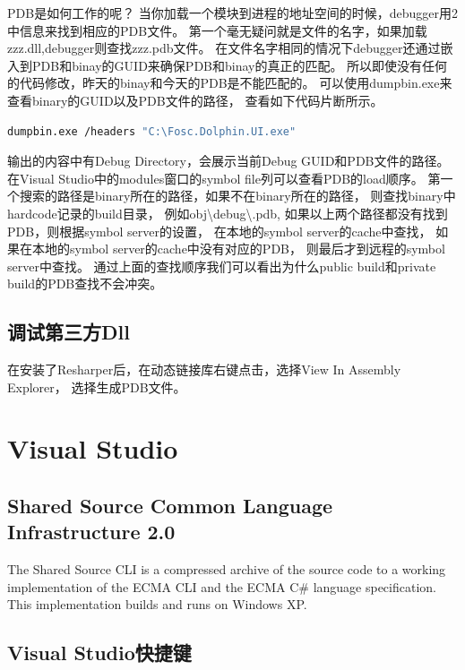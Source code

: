 \documentclass{book}
\begin{document}
PDB是如何工作的呢？
当你加载一个模块到进程的地址空间的时候，debugger用2中信息来找到相应的PDB文件。
第一个毫无疑问就是文件的名字，如果加载zzz.dll,debugger则查找zzz.pdb文件。
在文件名字相同的情况下debugger还通过嵌入到PDB和binay的GUID来确保PDB和binay的真正的匹配。
所以即使没有任何的代码修改，昨天的binay和今天的PDB是不能匹配的。
可以使用dumpbin.exe来查看binary的GUID以及PDB文件的路径，
查看如下代码片断所示。 

\begin{lstlisting}[language=Bash]
dumpbin.exe /headers "C:\Fosc.Dolphin.UI.exe"
\end{lstlisting}

输出的内容中有Debug Directory，会展示当前Debug GUID和PDB文件的路径。 
在Visual Studio中的modules窗口的symbol file列可以查看PDB的load顺序。
第一个搜索的路径是binary所在的路径，如果不在binary所在的路径，
则查找binary中hardcode记录的build目录，
例如obj\textbackslash debug\textbackslash *.pdb, 
如果以上两个路径都没有找到PDB，则根据symbol server的设置，
在本地的symbol server的cache中查找，
如果在本地的symbol server的cache中没有对应的PDB，
则最后才到远程的symbol server中查找。
通过上面的查找顺序我们可以看出为什么public build和private build的PDB查找不会冲突。 

\subsection{调试第三方Dll}

在安装了Resharper后，在动态链接库右键点击，选择View In Assembly Explorer，
选择生成PDB文件。



\section{Visual Studio}

\subsection{Shared Source Common Language Infrastructure 2.0}

The Shared Source CLI is a compressed archive of the source code 
to a working implementation of the ECMA CLI and the ECMA C\# language specification. 
This implementation builds and runs on Windows XP.

\subsection{Visual Studio快捷键}
\end{document}
